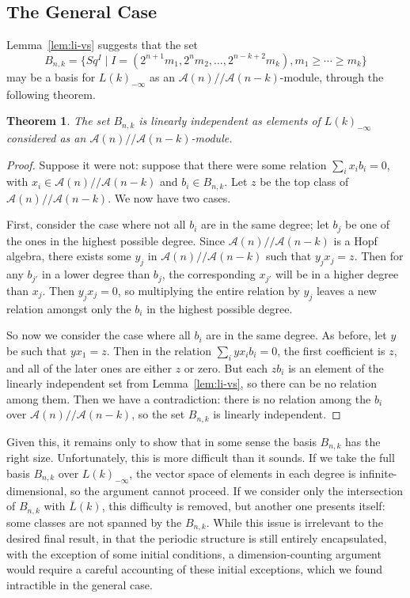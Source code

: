 \documentclass{article}
\newcommand{\A}{\mathcal{A}}
\newcommand{\mmod}{/\!/\!}
\renewcommand{\L}{\bar{L}}
\newcommand{\Lkm}[1][k]{L{(#1)}_{-\infty}}
\newtheorem{thm}{Theorem}
\begin{document}
\subsection{The General Case}

Lemma~\ref{lem:li-vs} suggests that the set
\[ B_{n,k} = \{Sq^I \mid I = (2^{n+1}m_1, 2^n m_2, \ldots, 2^{n-k+2}m_k), m_1 \geq \cdots \geq m_k \} \]
may be a basis for $\Lkm$ as an $\A(n)\mmod\A(n-k)$-module, through the following theorem.

\begin{thm}\label{thm:li-module}
  The set $B_{n,k}$ is linearly independent as elements of $\Lkm$ considered as an $\A(n)\mmod\A(n-k)$-module.
\end{thm}

\begin{proof}
  Suppose it were not: suppose that there were some relation $\sum_i x_i b_i = 0$, with $x_i\in\A(n)\mmod\A(n-k)$ and $b_i\in B_{n,k}$.  Let $z$ be the top class of $\A(n)\mmod\A(n-k)$.  We now have two cases.

  First, consider the case where not all $b_i$ are in the same degree; let $b_j$ be one of the ones in the highest possible degree.  Since $\A(n)\mmod\A(n-k)$ is a Hopf algebra, there exists some $y_j$ in $\A(n)\mmod\A(n-k)$ such that $y_j x_j = z$.  Then for any $b_{j'}$ in a lower degree than $b_j$, the corresponding $x_{j'}$ will be in a higher degree than $x_j$.  Then $y_j x_j = 0$, so multiplying the entire relation by $y_j$ leaves a new relation amongst only the $b_i$ in the highest possible degree.

  So now we consider the case where all $b_i$ are in the same degree.  As before, let $y$ be such that $y x_1 = z$.  Then in the relation $\sum_i y x_i b_i = 0$, the first coefficient is $z$, and all of the later ones are either $z$ or zero.  But each $z b_i$ is an element of the linearly independent set from Lemma~\ref{lem:li-vs}, so there can be no relation among them.  Then we have a contradiction: there is no relation among the $b_i$ over $\A(n)\mmod\A(n-k)$, so the set $B_{n,k}$ is linearly independent.
\end{proof}

Given this, it remains only to show that in some sense the basis $B_{n,k}$ has the right size.  Unfortunately, this is more difficult than it sounds.  If we take the full basis $B_{n,k}$ over $\Lkm$, the vector space of elements in each degree is infinite-dimensional, so the argument cannot proceed.  If we consider only the intersection of $B_{n,k}$ with $\L(k)$, this difficulty is removed, but another one presents itself: some classes are not spanned by the $B_{n,k}$.  While this issue is irrelevant to the desired final result, in that the periodic structure is still entirely encapsulated, with the exception of some initial conditions, a dimension-counting argument would require a careful accounting of these initial exceptions, which we found intractible in the general case.
\end{document}
